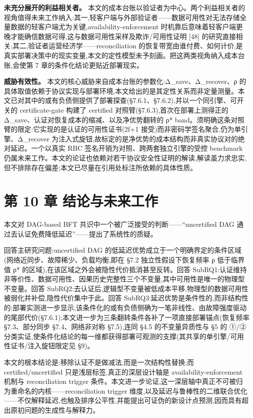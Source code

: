 \documentclass[UTF8,fontset=windows,a4paper,11pt]{ctexart}
\begin{document}
\textbf{未充分展开的利益相关者。}
本文的成本台账以验证者为中心。两个利益相关者的视角值得未来工作纳入:其一,轻客户端与外部验证者------数据可用性对无法存储全量数据的轻客户端尤为关键,availability-enforcement
时机靠后意味着轻客户端更晚才能确信数据可得,这与数据可用性采样及欺诈/可用性证明
{[}48{]} 的研究直接相关;其二,验证者运营经济学------reconciliation
的恢复带宽由谁付费、如何计价,是真实部署决策中的现实变量,本文的定性模型未予刻画。把这两类视角纳入成本台账,会使第
7 章的条件化结论更贴近部署现实。

\textbf{威胁有效性。}
本文的核心威胁来自成本台账的参数化:Δ\_save、Δ\_recover、ρ
的具体取值依赖于协议实现与部署环境,本文给出的是其定性关系而非定量测量。本文已对其中的或有负债侧提供了部署探查(§7.6.1、§7.6.2),并以一个同引擎、可开关的
certificate-gate 构建了 certified 对照臂(§7.6.3),首次在部署上测得正的
Δ\_save、认证对恢复成本的缩减、以及净优势翻转的 ρ*
band。须明确这条对照臂的限定:它实现的是认证的可用性证书(2f+1
接受)而非密码学签名聚合,仍为单引擎、Δ\_recover
为注入式旋钮,故标定的是净优势的成本结构而非真实协议对的绝对延迟。一个以真实
RBC 签名开销为对照、跨两套独立引擎的受控 benchmark
仍属未来工作。本文的论证也依赖对若干协议安全性证明的解读,解读虽力求忠实,但不排除存在偏差;本文已尽量在引用处标注所依赖的具体性质。

\section{第 10 章
结论与未来工作}\label{ux7b2c-10-ux7ae0-ux7ed3ux8bbaux4e0eux672aux6765ux5de5ux4f5c}

本文对 DAG-based BFT 共识中一个被广泛接受的判断------``uncertified DAG
通过去认证免费降低延迟''------提出了系统性的质疑。

回答主研究问题:uncertified DAG
的低延迟优势成立于一个明确界定的条件区域(网络近同步、故障稀少、负载均衡,即在
§7.2 独立性假设下恢复频率 ρ 低于临界值 ρ*
的区域),在该区域之外会被隐性代价抵消甚至反转。回答
SubRQ1:认证维持非等价性、数据可用性、因果历史完整性三个不变量,其中可用性是唯一的物理型不变量。回答
SubRQ2:去认证后,逻辑型不变量被低成本平移,物理型的数据可用性被弱化并补偿,隐性代价集中于此。回答
SubRQ3:延迟优势是条件性的,而非结构性的;部署实测进一步显示,该条件化的或有负债侧确为一笔非线性、由故障强度驱动的尾部代价(§7.6.1);本文进一步为三条翻转条件各补了一项直接部署锚点(恢复频率
§7.3、部分同步 §7.4、网络非对称 §7.5),连同 §4.5 的不变量异质性与 §5 的
①/②
分类实证,使条件化结论的每一维都获得部署可观测的支撑(其共享的单引擎/可用性证书/注入旋钮限定见
§9)。

本文的根本结论是:移除认证不是做减法,而是一次结构性替换;而
certified/uncertified 只是浅层标签,真正的深层设计轴是
availability-enforcement 机制与 reconciliation trigger
条件。本文进一步论证,这一深层轴中真正不可被归为重命名的内核------reconciliation
trigger
维度,以及延迟与鲁棒性的二维联合优化------不仅解释延迟,也触及排序公平性,并能提出可证伪的新设计点预测,因而具有超出原初问题的生成性与解释力。
\end{document}
